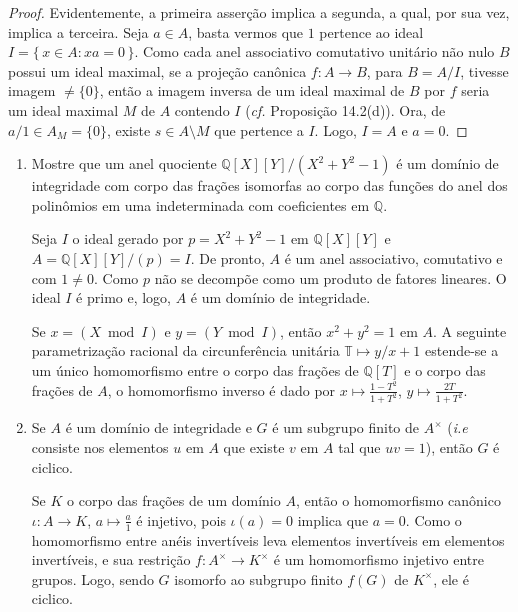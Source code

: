 \begin{proof}
Evidentemente, a primeira asserção implica a segunda, a qual, por sua vez, implica a terceira. Seja $a \in A$, basta vermos 
que $1$ pertence ao ideal $I = \{\, x \in A : xa = 0 \,\}$. Como cada anel associativo comutativo unitário não nulo $B$ possui um
ideal maximal, se a projeção canônica $f : A \to B$, para $B = A/I$, tivesse imagem $\neq \{0\}$, então a imagem inversa de um 
ideal maximal de $B$ por $f$ seria um ideal maximal $M$ de $A$ contendo $I$ (\emph{cf.} Proposição 14.2(d)). Ora, de 
$a/1 \in A_M = \{0\}$, existe $s \in A \setminus M$ que pertence a $I$. Logo, $I = A$ e $a = 0$.
\end{proof}

\begin{exemplo}
    \leavevmode
    \begin{enumerate}[left=0.5cm, align=left, nosep]
        \item Mostre que um anel quociente $\mathbb{Q}[X][Y]/(X^2 + Y^2 - 1)$ é um domínio de integridade com corpo das frações 
        isomorfas ao corpo das funções do anel dos polinômios em uma indeterminada com coeficientes em $\mathbb{Q}$.
        
        Seja $I$ o ideal gerado por $p = X^2 + Y^2 - 1$ em $\mathbb{Q}[X][Y]$ e $A = \mathbb{Q}[X][Y]/(p) = I$.
        De pronto, $A$ é um anel associativo, comutativo e com $1 \neq 0$. Como $p$ não se decompõe como um produto de fatores 
        lineares. O ideal $I$ é primo e, logo, $A$ é um domínio de integridade.

        Se $x = (X \bmod I)$ e $y = (Y \bmod I)$, então $x^2 + y^2 = 1$ em $A$. A seguinte parametrização racional da circunferência
        unitária $\mathbb{T} \mapsto y/x + 1$ estende-se a um único homomorfismo entre o corpo das frações de $\mathbb{Q}[T]$
        e o corpo das frações de $A$, o homomorfismo inverso é dado por $x \longmapsto \frac{1 - T^2}{1 + T^2}$,
        $y \longmapsto \frac{2T}{1 + T^2}$.

        \item Se $A$ é um domínio de integridade e $G$ é um subgrupo finito de $A^{\times}$ (\emph{i.e} consiste nos elementos $u$ 
        em $A$ que existe $v$ em $A$ tal que $uv = 1$), então $G$ é ciclico.
    
        Se $K$ o corpo das frações de um domínio $A$, então o homomorfismo canônico $\iota : A \to K$,  $a \mapsto \frac{a}{1}$ 
        é injetivo, pois $\iota(a)=0$ implica que $a=0$. Como o homomorfismo entre anéis invertíveis leva elementos invertíveis
        em elementos invertíveis, e sua restrição $f : A^\times \to K^\times$ é um homomorfismo injetivo entre grupos. Logo, 
        sendo $G$ isomorfo ao subgrupo finito $f(G)$ de $K^\times$, ele é ciclico.


\end{enumerate}
\end{exemplo}
